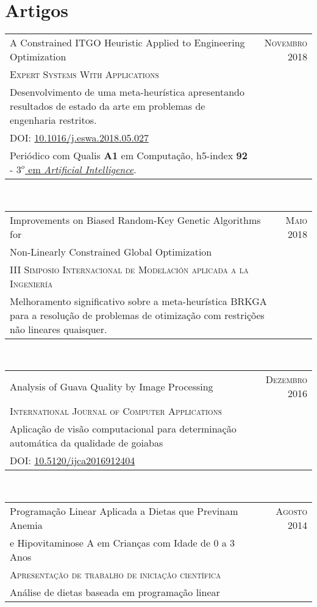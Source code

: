 \section{Artigos}

\begin{tabular}{p{11cm}|r}
  \label{C-ITGO}
  A Constrained ITGO Heuristic Applied to Engineering Optimization & \textsc{Novembro 2018} \\
  \textsc{Expert Systems With Applications} & \\
  \footnotesize{Desenvolvimento de uma meta-heurística apresentando resultados de estado da arte em problemas de engenharia restritos.} & \\
  \footnotesize{DOI: \href{https://doi.org/10.1016/j.eswa.2018.05.027}{10.1016/j.eswa.2018.05.027}} & \\
    \footnotesize{Periódico com Qualis \textbf{A1} em Computação, h5-index \textbf{92} - \href{https://scholar.google.com/citations?view_op=top_venues&hl=en&vq=eng_artificialintelligence}{$3^o$ em \textit{Artificial Intelligence}}. } & \\
\end{tabular}\\

\begin{tabular}{p{11cm}|r}
  \label{BRKGA}
  Improvements on Biased Random-Key Genetic Algorithms for & \textsc{Maio 2018} \\
  Non-Linearly Constrained Global Optimization & \\
  \textsc{III Simposio Internacional de Modelación aplicada a la Ingeniería} & \\
  \footnotesize{Melhoramento significativo sobre a meta-heurística BRKGA para a resolução de problemas de otimização com restrições não lineares quaisquer.} & \\
\end{tabular}\\


\begin{tabular}{p{11cm}|r}
  \label{jseg}
  Analysis of Guava Quality by Image Processing & \textsc{Dezembro 2016} \\
  \textsc{International Journal of Computer Applications} & \\
  \footnotesize{Aplicação de visão computacional para determinação automática da qualidade de goiabas} & \\
  \footnotesize{DOI: \href{https://doi.org/10.5120/ijca2016912404}{10.5120/ijca2016912404}} & \\
\end{tabular}\\


\begin{tabular}{p{11cm}|r}
  Programação Linear Aplicada a Dietas que Previnam Anemia  & \textsc{Agosto 2014} \\
  e Hipovitaminose A em Crianças com Idade de 0 a 3 Anos & \\
  \textsc{Apresentação de trabalho de iniciação científica} & \\
  \footnotesize{Análise de dietas baseada em programação linear} & \\
\end{tabular}\\